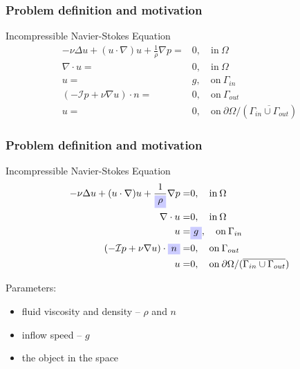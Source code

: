 \documentclass[18pt]{beamer}
\begin{document}
\begin{frame}[t]
  \frametitle{Problem definition and motivation}
  \begin{block}{Incompressible Navier-Stokes Equation}
  \begin{align*}
          -\nu\Delta u + (u\cdot\nabla)u + \frac{1}{\rho}\nabla p =& 0,  \quad\text{in}\: \Omega\\
          \nabla\cdot u =& 0, \quad\text{in}\: \Omega \\
          u =& g, \quad\text{on}\: \Gamma_{in} \\
          (-\mathcal{I}p + \nu\nabla u)\cdot n =& 0, \quad\text{on}\: \Gamma_{out} \\
          u =& 0, \quad\text{on}\:  \partial\Omega\slash (\overline{\Gamma_{in}\cup\Gamma_{out}})
  \end{align*}
  \end{block}
  \vspace*{1.5cm}
\end{frame}

\begin{frame}[t]
  \frametitle{Problem definition and motivation}
  \vspace*{-0.5cm}
  \begin{block}{Incompressible Navier-Stokes Equation}
  \begin{align*}
           -\nu\Delta u + (u\cdot\nabla)u + \frac{1}{\tikz[baseline]{
            \node[fill=blue!20,anchor=base] (t1)
            {$\rho$};}}\nabla p =& 0,  \quad\text{in}\: \Omega\\
          \nabla\cdot u =& 0, \quad\text{in}\: \Omega \\
          u =& \tikz[baseline]{
            \node[fill=blue!20,anchor=base] (t1)
            {$g$};}, \quad\text{on}\: \Gamma_{in} \\
          (-\mathcal{I}p + \nu\nabla u)\cdot \tikz[baseline]{
            \node[fill=blue!20,anchor=base] (t1)
            {$n$};} =& 0, \quad\text{on}\: \Gamma_{out} \\
          u =& 0, \quad\text{on}\:  \partial\Omega\slash (\overline{\Gamma_{in}\cup\Gamma_{out}})
  \end{align*}
\end{block}
Parameters:
\begin{itemize}
\item fluid viscosity and density -- $\rho$ and $n$
\item inflow speed -- $g$
\item the object in the space
\end{itemize}
\end{frame}
\end{document}
